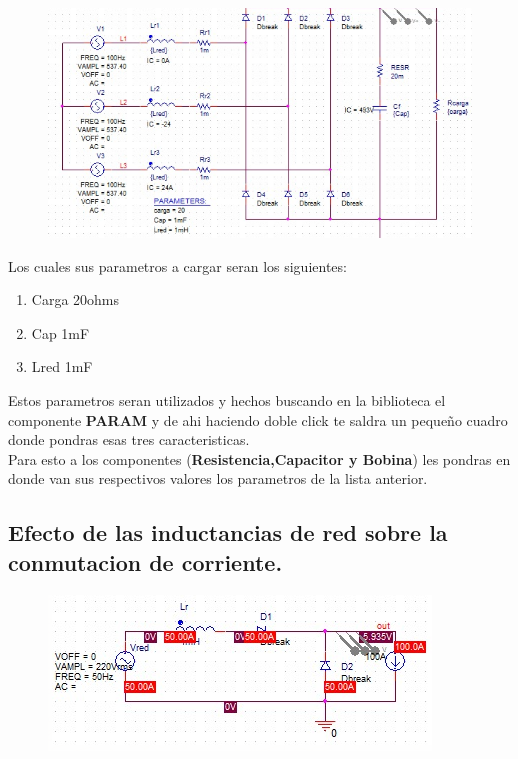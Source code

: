 \documentclass[11pt,a4paper]{article}
\begin{document}
\begin{figure}[h]
\centering
\includegraphics[scale=.6]{13.png} 
\end{figure}

Los cuales sus parametros a cargar seran los siguientes:
\begin{enumerate}
\item Carga 20ohms
\item Cap 1mF
\item Lred 1mF
\end{enumerate}

Estos parametros seran utilizados y hechos buscando en la biblioteca el componente \textbf{PARAM} y de ahi haciendo doble click te saldra un pequeño cuadro donde pondras esas tres caracteristicas.\\
Para esto a los componentes (\textbf{Resistencia,Capacitor y Bobina}) les pondras en donde van sus respectivos valores los parametros de la lista anterior.

\subsection{Efecto de las inductancias de red sobre la conmutacion de corriente.}

\begin{figure}[h]
\centering
\includegraphics[scale=.5]{14.png} 
\end{figure}
\end{document}
